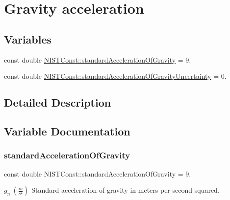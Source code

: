 \hypertarget{group___gravity_acceleration}{}\section{Gravity acceleration}
\label{group___gravity_acceleration}
\subsection*{Variables}
\begin{DoxyCompactItemize}
\item 
const double \hyperlink{group___gravity_acceleration_gad5bc5f7f030bc2c467a8430e00b42f5e}{N\+I\+S\+T\+Const\+::standard\+Acceleration\+Of\+Gravity} = 9.
\item 
const double \hyperlink{group___gravity_acceleration_gaabc6df92c25677a5b767445f101d4f57}{N\+I\+S\+T\+Const\+::standard\+Acceleration\+Of\+Gravity\+Uncertainty} = 0.
\end{DoxyCompactItemize}


\subsection{Detailed Description}


\subsection{Variable Documentation}
\mbox{\label{group___gravity_acceleration_gad5bc5f7f030bc2c467a8430e00b42f5e}} 
\subsubsection{\texorpdfstring{standard\+Acceleration\+Of\+Gravity}{standardAccelerationOfGravity}}
{\footnotesize\ttfamily const double N\+I\+S\+T\+Const\+::standard\+Acceleration\+Of\+Gravity = 9.}

$g_n \ (\frac{m}{s^2})$ Standard acceleration of gravity in meters per second squared. \mbox{\label{group___gravity_acceleration_gaabc6df92c25677a5b767445f101d4f57}} 
